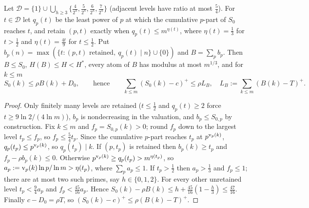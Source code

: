 \begin{lemma}\label{lem:h97-3}
Let $\mathcal D=\{1\}\cup\bigcup_{h\ge3}\{\tfrac4{2^h},\tfrac5{2^h},\tfrac6{2^h},\tfrac7{2^h}\}$ (adjacent levels
have ratio at most $\tfrac54$). For $t\in\mathcal D$ let $q_p(t)$ be the least power of $p$ at which the cumulative
$p$-part of $S_0$ reaches $t$, and retain $(p,t)$ exactly when $q_p(t)\le m^{\eta(t)}$, where $\eta(t)=\tfrac13$ for
$t>\tfrac12$ and $\eta(t)=\tfrac{4t}9$ for $t\le\tfrac12$. Put $b_p(n)=\max(\{t:(p,t)\text{ retained},\
q_p(t)\mid n\}\cup\{0\})$ and $B=\sum_pb_p$. Then $B\le S_0$, $H(B)\le H<H^*$, every atom of $B$ has modulus at most
$m^{1/3}$, and for $k\le m$
\[
S_0(k)\le\rho B(k)+D_0,\qquad\text{hence}\qquad
\sum_{k\le m}(S_0(k)-c)^+\le\rho L_B,\quad L_B:=\sum_{k\le m}(B(k)-T)^+ .
\]
\end{lemma}
\begin{proof}
Only finitely many levels are retained ($t\le\tfrac12$ and $q_p(t)\ge2$ force $t\ge9\ln2/(4\ln m)$), $b_p$ is
nondecreasing in the valuation, and $b_p\le S_{0,p}$ by construction. Fix $k\le m$ and $f_p=S_{0,p}(k)>0$; round $f_p$
down to the largest level $t_p\le f_p$, so $f_p\le\tfrac54t_p$. Since the cumulative $p$-part reaches $t_p$ at
$p^{\operatorname{v}_p(k)}$, $q_p(t_p)\le p^{\operatorname{v}_p(k)}$, so $q_p(t_p)\mid k$. If $(p,t_p)$ is retained then $b_p(k)\ge t_p$ and
$f_p-\rho b_p(k)\le0$. Otherwise $p^{\operatorname{v}_p(k)}\ge q_p(t_p)>m^{\eta(t_p)}$, so $a_p:=\operatorname{v}_p(k)\ln p/\ln m>\eta(t_p)$,
where $\sum_pa_p\le1$. If $t_p>\tfrac12$ then $a_p>\tfrac13$ and $f_p\le1$; there are at most two such primes, say
$h\in\{0,1,2\}$. For every other unretained level $t_p<\tfrac94a_p$ and $f_p<\tfrac{45}{16}a_p$. Hence
$S_0(k)-\rho B(k)\le h+\tfrac{45}{16}(1-\tfrac h3)\le\tfrac{47}{16}$. Finally $c-D_0=\rho T$, so
$(S_0(k)-c)^+\le\rho(B(k)-T)^+$.
\end{proof}

